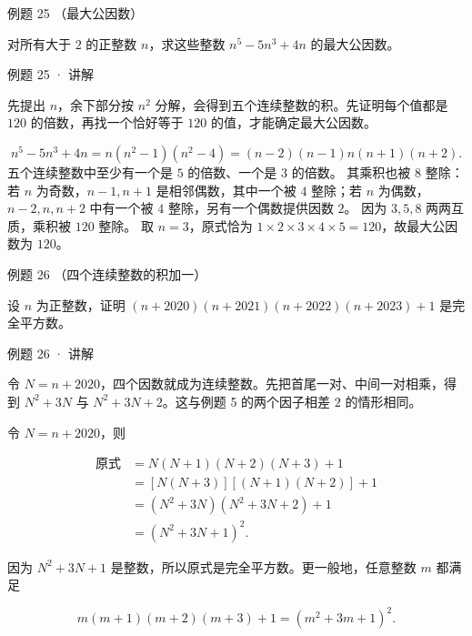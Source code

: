 
\begin{problem}{例题 25 （最大公因数）}

对所有大于 $2$ 的正整数 $n$，求这些整数 $n^5-5n^3+4n$ 的最大公因数。

\end{problem}


\begin{solution}{例题 25 · 讲解}

\think 先提出 $n$，余下部分按 $n^2$ 分解，会得到五个连续整数的积。先证明每个值都是 $120$ 的倍数，再找一个恰好等于 $120$ 的值，才能确定最大公因数。

\solve \[n^5-5n^3+4n=n(n^2-1)(n^2-4)=(n-2)(n-1)n(n+1)(n+2).\]
五个连续整数中至少有一个是 $5$ 的倍数、一个是 $3$ 的倍数。
其乘积也被 $8$ 整除：若 $n$ 为奇数，$n-1,n+1$ 是相邻偶数，其中一个被 $4$ 整除；若 $n$ 为偶数，$n-2,n,n+2$ 中有一个被 $4$ 整除，另有一个偶数提供因数 $2$。
因为 $3,5,8$ 两两互质，乘积被 $120$ 整除。
取 $n=3$，原式恰为 $1\times2\times3\times4\times5=120$，故最大公因数为 $120$。


\end{solution}


\par\noindent\begin{minipage}{\linewidth}

\begin{problem}{例题 26 （四个连续整数的积加一）}

设 $n$ 为正整数，证明 $(n+2020)(n+2021)(n+2022)(n+2023)+1$ 是完全平方数。

\end{problem}


\begin{solution}[breakable=false]{例题 26 · 讲解}

\think 令 $N=n+2020$，四个因数就成为连续整数。先把首尾一对、中间一对相乘，得到 $N^2+3N$ 与 $N^2+3N+2$。这与例题 5 的两个因子相差 $2$ 的情形相同。

\solve 令 $N=n+2020$，则

\begin{align*}
\text{原式}&=N(N+1)(N+2)(N+3)+1\\
&=[N(N+3)][(N+1)(N+2)]+1\\
&=(N^2+3N)(N^2+3N+2)+1\\
&=(N^2+3N+1)^2.
\end{align*}

因为 $N^2+3N+1$ 是整数，所以原式是完全平方数。更一般地，任意整数 $m$ 都满足

\[
m(m+1)(m+2)(m+3)+1=(m^2+3m+1)^2.
\]


\end{solution}

\end{minipage}\par\medskip

